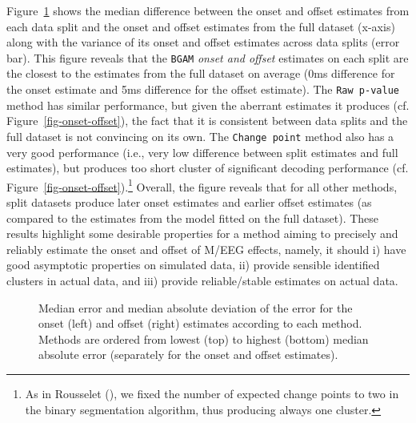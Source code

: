 \documentclass[
  doc,
  floatsintext,
  longtable,
  a4paper,
  nolmodern,
  notxfonts,
  notimes,
  donotrepeattitle,
  colorlinks=true,linkcolor=blue,citecolor=blue,urlcolor=blue]{apa7}
\begin{document}
Figure~\ref{fig-reliability} shows the median difference between the
onset and offset estimates from each data split and the onset and offset
estimates from the full dataset (x-axis) along with the variance of its
onset and offset estimates across data splits (error bar). This figure
reveals that the \texttt{BGAM} \emph{onset and offset} estimates on each
split are the closest to the estimates from the full dataset on average
(0ms difference for the onset estimate and 5ms difference for the offset
estimate). The \texttt{Raw\ p-value} method has similar performance, but
given the aberrant estimates it produces (cf.
Figure~\ref{fig-onset-offset}), the fact that it is consistent between
data splits and the full dataset is not convincing on its own. The
\texttt{Change\ point} method also has a very good performance (i.e.,
very low difference between split estimates and full estimates), but
produces too short cluster of significant decoding performance (cf.
Figure~\ref{fig-onset-offset}).\footnote{As in Rousselet
  (), we fixed the number of
  expected change points to two in the binary segmentation algorithm,
  thus producing always one cluster.} Overall, the figure reveals that
for all other methods, split datasets produce later onset estimates and
earlier offset estimates (as compared to the estimates from the model
fitted on the full dataset). These results highlight some desirable
properties for a method aiming to precisely and reliably estimate the
onset and offset of M/EEG effects, namely, it should i) have good
asymptotic properties on simulated data, ii) provide sensible identified
clusters in actual data, and iii) provide reliable/stable estimates on
actual data.

\begin{figure}[!htb]

\caption{\label{fig-reliability}Median error and median absolute
deviation of the error for the onset (left) and offset (right) estimates
according to each method. Methods are ordered from lowest (top) to
highest (bottom) median absolute error (separately for the onset and
offset estimates).}


\end{figure}%
\end{document}

